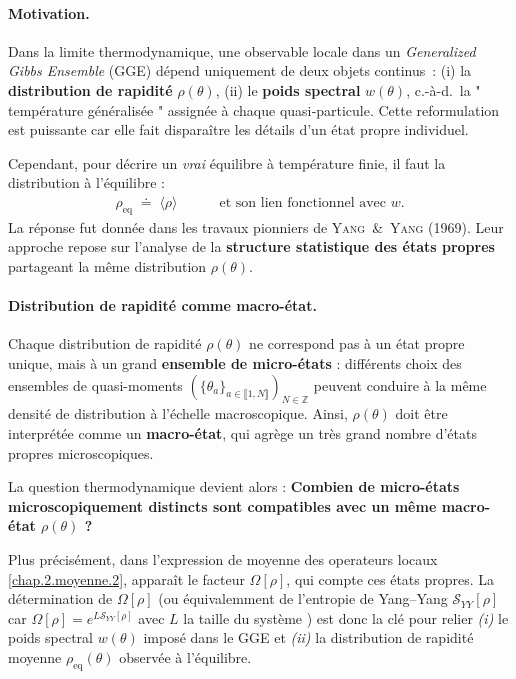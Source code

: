 \paragraph{Motivation.}

Dans la limite thermodynamique, une observable locale dans un \textit{Generalized Gibbs Ensemble} (GGE) dépend uniquement de deux objets continus :  (i)  la \textbf{distribution de rapidité} $\rho(\theta)$, (ii) le \textbf{poids spectral} $w(\theta)$, c.-à-d.\ la " température généralisée " assignée à chaque quasi‑particule.
Cette reformulation est puissante car elle fait disparaître les détails d’un état propre individuel.  

\medskip
Cependant, pour décrire un \emph{vrai} équilibre à température finie, il faut la distribution à l'équilibre :
\begin{eqnarray*}
	\rho_{\mathrm{eq}}\;\doteq\;\langle \rho \rangle	 \quad \qquad\text{et son lien fonctionnel avec }w.
\end{eqnarray*}
La réponse fut donnée dans les travaux pionniers de \textsc{Yang \& Yang} (1969).  
Leur approche repose sur l’analyse de la \textbf{structure statistique des états propres} partageant la même distribution $\rho(\theta)$.


\paragraph{Distribution de rapidité comme macro-état.}

Chaque distribution de rapidité $\rho(\theta)$ ne correspond pas à un état propre unique, mais à un grand {\bf ensemble de micro-états} : différents choix des ensembles de quasi-moments $(\{\theta_a\}_{a \in \llbracket 1 , N \rrbracket })_{N \in \mathbb{Z}} $ peuvent conduire à la même densité de distribution à l’échelle macroscopique. Ainsi, $\rho(\theta)$ doit être interprétée comme un {\bf macro-état}, qui agrège un très grand nombre d’états propres microscopiques.

La question thermodynamique devient alors : {\bf Combien de micro-états microscopiquement distincts sont compatibles avec un même macro-état $\rho(\theta)$ ?} 

\medskip
Plus précisément, dans l’expression de moyenne des operateurs locaux \eqref{chap.2.moyenne.2}, apparaît le facteur
\(
\Omega[\rho]
\),
qui compte ces états propres.  
La détermination de $\Omega[\rho]$ (ou équivalemment de l’entropie de Yang–Yang $\mathcal{S}_{YY}[\rho]$ car 
\(
\Omega[\rho] = e^{L\mathcal{S}_{YY}[\rho]}
\)
avec $L$ la taille du système
) est donc la clé pour relier \emph{(i)} le poids spectral $w(\theta)$ imposé dans le GGE et \emph{(ii)} la distribution de rapidité moyenne $\rho_{\mathrm{eq}}(\theta)$ observée à l’équilibre.

